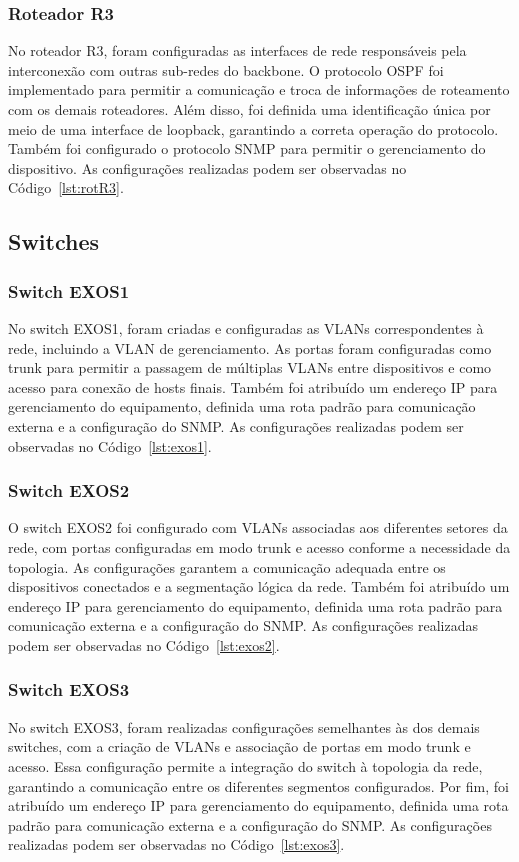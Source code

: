 \subsubsection{Roteador R3}
No roteador R3, foram configuradas as interfaces de rede responsáveis pela interconexão com outras sub-redes do backbone. O protocolo OSPF foi implementado para permitir a comunicação e troca de informações de roteamento com os demais roteadores. Além disso, foi definida uma identificação única por meio de uma interface de loopback, garantindo a correta operação do protocolo. Também foi configurado o protocolo SNMP para permitir o gerenciamento do dispositivo. As configurações realizadas podem ser observadas no Código~\ref{lst:rotR3}.

\subsection{Switches}

\subsubsection{Switch EXOS1}

No switch EXOS1, foram criadas e configuradas as VLANs correspondentes à rede, incluindo a VLAN de gerenciamento. As portas foram configuradas como trunk para permitir a passagem de múltiplas VLANs entre dispositivos e como acesso para conexão de hosts finais. Também foi atribuído um endereço IP para gerenciamento do equipamento, definida uma rota padrão para comunicação externa e a configuração do SNMP. As configurações realizadas podem ser observadas no Código~\ref{lst:exos1}.

\subsubsection{Switch EXOS2}
O switch EXOS2 foi configurado com VLANs associadas aos diferentes setores da rede, com portas configuradas em modo trunk e acesso conforme a necessidade da topologia. As configurações garantem a comunicação adequada entre os dispositivos conectados e a segmentação lógica da rede. Também foi atribuído um endereço IP para gerenciamento do equipamento, definida uma rota padrão para comunicação externa e a configuração do SNMP. As configurações realizadas podem ser observadas no Código~\ref{lst:exos2}.

\subsubsection{Switch EXOS3}
No switch EXOS3, foram realizadas configurações semelhantes às dos demais switches, com a criação de VLANs e associação de portas em modo trunk e acesso. Essa configuração permite a integração do switch à topologia da rede, garantindo a comunicação entre os diferentes segmentos configurados. Por fim, foi atribuído um endereço IP para gerenciamento do equipamento, definida uma rota padrão para comunicação externa e a configuração do SNMP. As configurações realizadas podem ser observadas no Código~\ref{lst:exos3}.

